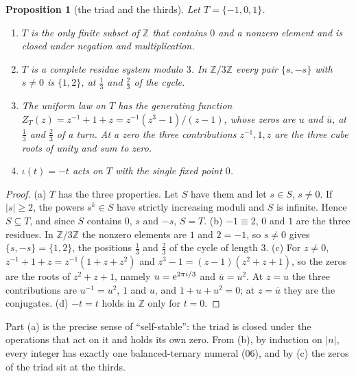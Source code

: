 \documentclass[11pt]{article}
\newtheorem{proposition}[theorem]{Proposition}
\theoremstyle{definition}\newtheorem{definition}[theorem]{Definition}
\theoremstyle{remark}\newtheorem{remark}[theorem]{Remark}
\begin{document}
\begin{proposition}[the triad and the thirds]\label{prop:triad}
Let $T=\{-1,0,1\}$.
\begin{enumerate}[label=(\alph*)]
\item $T$ is the only finite subset of $\mathbb Z$ that contains $0$ and a nonzero element and is closed under negation and multiplication.
\item $T$ is a complete residue system modulo $3$. In $\mathbb Z/3\mathbb Z$ every pair $\{s,-s\}$ with $s\ne0$ is $\{1,2\}$, at $\frac13$ and $\frac23$ of the cycle.
\item The uniform law on $T$ has the generating function $Z_T(z)=z^{-1}+1+z=z^{-1}(z^3-1)/(z-1)$, whose zeros are $u$ and $\bar u$, at $\frac13$ and $\frac23$ of a turn. At a zero the three contributions $z^{-1},1,z$ are the three cube roots of unity and sum to zero.
\item $\iota(t)=-t$ acts on $T$ with the single fixed point $0$.
\end{enumerate}
\end{proposition}
\begin{proof}
(a) $T$ has the three properties. Let $S$ have them and let $s\in S$, $s\ne0$. If $|s|\ge2$, the powers $s^k\in S$ have strictly increasing moduli and $S$ is infinite. Hence $S\subseteq T$, and since $S$ contains $0$, $s$ and $-s$, $S=T$. (b) $-1\equiv2$, $0$ and $1$ are the three residues. In $\mathbb Z/3\mathbb Z$ the nonzero elements are $1$ and $2=-1$, so $s\ne0$ gives $\{s,-s\}=\{1,2\}$, the positions $\frac13$ and $\frac23$ of the cycle of length $3$. (c) For $z\ne0$, $z^{-1}+1+z=z^{-1}(1+z+z^2)$ and $z^3-1=(z-1)(z^2+z+1)$, so the zeros are the roots of $z^2+z+1$, namely $u=\mathrm e^{2\pi i/3}$ and $\bar u=u^2$. At $z=u$ the three contributions are $u^{-1}=u^2$, $1$ and $u$, and $1+u+u^2=0$; at $z=\bar u$ they are the conjugates. (d) $-t=t$ holds in $\mathbb Z$ only for $t=0$.
\end{proof}
Part (a) is the precise sense of ``self-stable'': the triad is closed under the operations that act on it and holds its own zero. From (b), by induction on $|n|$, every integer has exactly one balanced-ternary numeral (06), and by (c) the zeros of the triad sit at the thirds.
\end{document}
